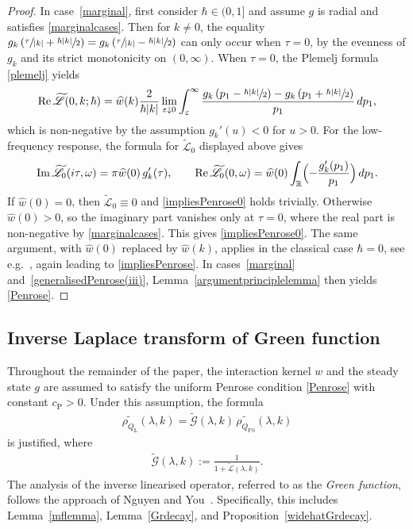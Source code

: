 \documentclass[10pt,a4paper]{amsart}
\providecommand{\eg}{e.g.\ }
\theoremstyle{plain}
\theoremstyle{remark}
\newcommand{\Bbr}[1]{\Bigl(#1 \Bigr)}
\newcommand{\R}{\mathbb{R}}
\begin{document}
\begin{proof}
In case~\eqref{marginal}, first consider $\hbar\in(0,1]$ and assume \( g \) is radial and satisfies \eqref{marginalcases}. Then for \( k \neq 0 \), the equality $g_k\left( \sfrac{\tau}{\abs{k}} + \sfrac{\hbar \abs{k}}{2} \right)
=
g_k\left( \sfrac{\tau}{\abs{k}} - \sfrac{\hbar \abs{k}}{2} \right)$
can only occur when \( \tau = 0 \), by the evenness of \( g_k \) and its strict monotonicity on $(0,\infty)$. When \( \tau = 0 \), the Plemelj formula \eqref{plemelj} yields
\[
\Re \widetilde{\mathscr L}(0,k;\hbar)
= \widehat w(k)\frac{2}{\hbar \abs{k}}
\lim_{\varepsilon \downarrow 0} \int_\varepsilon^\infty
\frac{
g_k\left(p_1 - \sfrac{\hbar \abs{k}}{2}\right)
- g_k\left(p_1 + \sfrac{\hbar \abs{k}}{2}\right)
}{p_1} \, dp_1,
\]
which is non-negative by the assumption \( g_k'(u) < 0 \) for \( u > 0 \). For the low-frequency response, the formula for \( \widetilde{\mathscr L}_0 \) displayed above gives
\[
\Im \widetilde{\mathscr L}_0(i\tau,\omega) = \pi\widehat w(0)\,g_k'(\tau),
\qquad
\Re \widetilde{\mathscr L}_0(0,\omega) = \widehat w(0)\int_{\R}\Bbr{-\frac{g_k'(p_1)}{p_1}}\,dp_1.
\]
If \( \widehat w(0)=0 \), then \( \widetilde{\mathscr L}_0\equiv0 \) and \eqref{impliesPenrose0} holds trivially. Otherwise \( \widehat w(0)>0 \), so the imaginary part vanishes only at \( \tau = 0 \), where the real part is non-negative by \eqref{marginalcases}. This gives \eqref{impliesPenrose0}. The same argument, with \( \widehat w(0) \) replaced by \( \widehat w(k) \), applies in the classical case \( \hbar = 0 \), see \eg \cite{bed-mas-mou-2016}, again leading to \eqref{impliesPenrose}. In cases~\eqref{marginal} and~\eqref{generalisedPenrose(iii)}, Lemma~\ref{argumentprinciplelemma} then yields \eqref{Penrose}.
\end{proof}

\subsection{Inverse Laplace transform of Green function}
Throughout the remainder of the paper, the interaction kernel \( w \) and the steady state \( g \) are assumed to satisfy the uniform Penrose condition \eqref{Penrose} with constant \( {c_{\mathrm{P}}} > 0 \). Under this assumption, the formula
\begin{align}
\widetilde{\rho_{Q_{\mathrm{L}}}}(\lambda,k) = \widetilde{\mathscr{G}}(\lambda,k)\,\widetilde{\rho_{Q_{\mathrm{FS}}}}(\lambda,k) \label{1/1+L}
\end{align}
is justified, where
\begin{align}
\widetilde{\mathscr{G}}(\lambda,k) := \frac{1}{1 + \widetilde{\mathscr{L}}(\lambda,k)}. \label{definitionofwidetildeG}
\end{align}
The analysis of the inverse linearised operator, referred to as the \textit{Green function}, follows the approach of Nguyen and You~\cite{NguyenYou2023}. Specifically, this includes Lemma~\ref{mflemma}, Lemma~\ref{Grdecay}, and Proposition~\ref{widehatGrdecay}.
\end{document}
